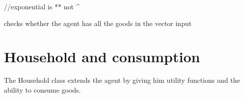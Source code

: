\documentclass[letterpaper,10pt,english]{sphinxmanual}
\begin{document}
\begin{fulllineitems}
\begin{fulllineitems}
//exponential is ** not \textasciicircum{}

\end{fulllineitems}


\begin{fulllineitems}
\label{Firm:abce.Firm.sufficient_goods}
checks whether the agent has all the goods in the vector input

\end{fulllineitems}


\end{fulllineitems}



\chapter{Household and consumption}
\label{Household:module-household}\label{Household:household-and-consumption}\label{Household::doc}
The Household class extends the agent by giving him utility functions and the ability to consume goods.
\end{document}
